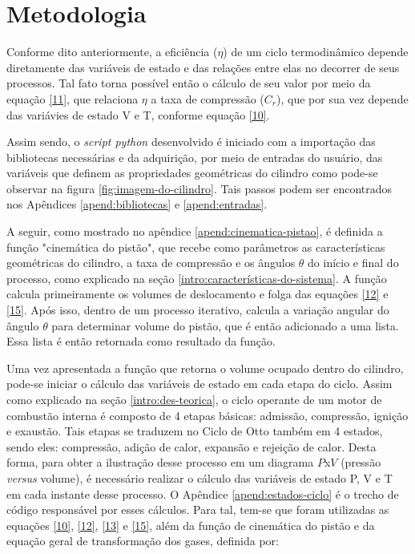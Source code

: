 \documentclass[10pt, conference, letterpaper]{IEEEtran}
\begin{document}
\section{Metodologia}
Conforme dito anteriormente, a eficiência ($\eta$) de um ciclo termodinâmico depende diretamente das variáveis de estado e das relações entre elas no decorrer de seus processos. Tal fato torna possível então o cálculo de seu valor por meio da equação \ref{11}, que relaciona $\eta$ a taxa de compressão ($C_r$), que por sua vez depende das variávies de estado V e T, conforme equação \ref{10}. 

Assim sendo, o \textit{script python} desenvolvido é iniciado com a importação das bibliotecas necessárias e da adquirição, por meio de entradas do usuário, das variáveis que definem as propriedades geométricas do cilindro como pode-se observar na figura \ref{fig:imagem-do-cilindro}. Tais passos podem ser encontrados nos Apêndices \ref{apend:bibliotecas} e \ref{apend:entradas}.

A seguir, como mostrado no apêndice \ref{apend:cinematica-pistao}, é definida a função "cinemática do pistão", que recebe como parâmetros as características geométricas do cilindro, a taxa de compressão e os ângulos $\theta$ do início e final do processo, como explicado na seção \ref{intro:características-do-sistema}. A função calcula primeiramente os volumes de deslocamento e folga das equações \ref{12} e \ref{15}. Após isso, dentro de um processo iterativo, calcula a variação angular do ângulo $\theta$ para determinar volume do pistão, que é então adicionado a uma lista. Essa lista é então retornada como resultado da função.

Uma vez apresentada a função que retorna o volume ocupado dentro do cilindro, pode-se iniciar o cálculo das variáveis de estado em cada etapa do ciclo. Assim como explicado na seção \ref{intro:des-teorica}, o ciclo operante de um motor de combustão interna é composto de 4 etapas básicas: admissão, compressão, ignição e exaustão. Tais etapas se traduzem no Ciclo de Otto também em 4 estados, sendo eles: compressão, adição de calor, expansão e rejeição de calor. Desta forma, para obter a ilustração desse processo em um diagrama $P$x$V$ (pressão \textit{versus} volume), é necessário realizar o cálculo das variáveis de estado P, V e T em cada instante desse processo. O Apêndice \ref{apend:estados-ciclo} é o trecho de código responsável por esses cálculos. Para tal, tem-se que foram utilizadas as equações \ref{10}, \ref{12}, \ref{13} e \ref{15}, além da função de cinemática do pistão e da equação geral de transformação dos gases, definida por: 
\end{document}

